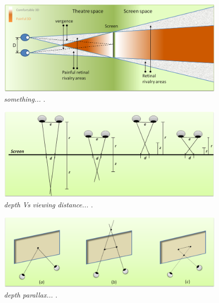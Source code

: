\begin{figure}[ht]
\centerline{\includegraphics[width=1.0\textwidth]{Stereoscopic_comfort_zone.png}}
\caption{\textit{something... \cite{bib:video_production}} \label{fig:Stereoscopic comfort zone}.}
\end{figure}



\begin{figure}[ht]
\centerline{\includegraphics[width=1.0\textwidth]{depth_Vs_viewing_distance.png}}
\caption{\textit{depth Vs viewing distance... \cite{bib:video_production}} \label{fig:depth Vs viewing distance}.}
\end{figure}


\begin{figure}[ht]
\centerline{\includegraphics[width=1.0\textwidth]{depth_parallax.png}}
\caption{\textit{depth parallax... \cite{bib:production_rules}} \label{fig:depth parallax}.}
\end{figure}


